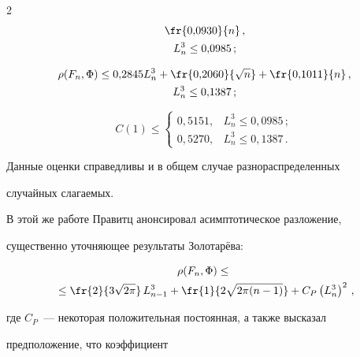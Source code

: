 \begin{multicols}{2}
\begin{multline}
\fr{0{,}0930}{n}\,,\\


 L_n^3\le 0{,}0985\,; \label{Prawitz_exp1}


\end{multline}


\begin{multline}


\rho(F_n,\Phi)\le 0{,}2845 L_n^3+\fr{0{,}2060}{\sqrt n}+


\fr{0{,}1011}{n}\,,\\


 L_n^3\le0{,}1387\,; \label{Prawitz_exp2}


\end{multline}


\begin{equation}


\label{Prawitz_abs_asympt_estim}


C(1)\le


\begin{cases}


0{,}5151,& L_n^3\le0{,}0985\,;\\


0{,}5270,& L_n^3\le0{,}1387\,.\end{cases}


\end{equation}


Данные оценки справедливы и в общем случае разнораспределенных


случайных слагаемых.





В этой же работе Правитц анонсировал асимптотическое разложение,


существенно уточняющее результаты Золотарёва:


\begin{multline}


\label{Prawitz_estim_expansion}


\rho(F_n,\Phi)\le{}\\


{}\le


 \fr{2}{3\sqrt{2\pi}}\, L_{n-1}^3+


\fr{1}{2\sqrt{2\pi(n-1)}}+ C_{P}\left(L_n^3\right)^2\,,


\end{multline}


где $C_P$~--- некоторая положительная постоянная, а также высказал


предположение, что коэффициент



\end{multicols}
